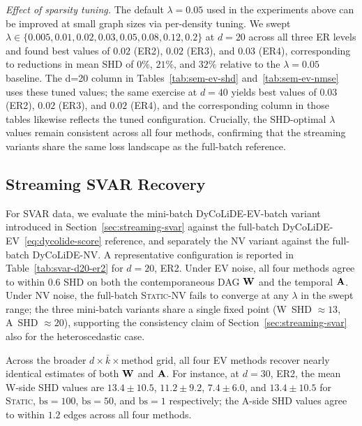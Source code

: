 \documentclass[journal,twoside]{IEEEtran}
\begin{document}
\textit{Effect of sparsity tuning.} The default $\lambda = 0.05$ used
in the experiments above can be improved at small graph sizes via
per-density tuning. We swept
$\lambda \in \{0.005, 0.01, 0.02, 0.03, 0.05, 0.08, 0.12, 0.2\}$ at
$d = 20$ across all three ER levels and found best values of
$0.02$ (ER2), $0.02$ (ER3), and $0.03$ (ER4), corresponding to
reductions in mean SHD of $0\%$, $21\%$, and $32\%$ relative to the
$\lambda = 0.05$ baseline. The d=20 column in
Tables~\ref{tab:sem-ev-shd} and~\ref{tab:sem-ev-nmse} uses these tuned
values; the same exercise at $d = 40$ yields best values of $0.03$
(ER2), $0.02$ (ER3), and $0.02$ (ER4), and the corresponding column
in those tables likewise reflects the tuned configuration.
Crucially, the SHD-optimal $\lambda$ values remain consistent across
all four methods, confirming that the streaming variants share the
same loss landscape as the full-batch reference.



\subsection{Streaming SVAR Recovery}
\label{sec:exp-svar}
For SVAR data, we evaluate the mini-batch
DyCoLiDE-EV-batch variant introduced in
Section~\ref{sec:streaming-svar} against the full-batch
DyCoLiDE-EV~\eqref{eq:dycolide-score} reference, and separately the
NV variant against the full-batch DyCoLiDE-NV. A representative
configuration is reported in Table~\ref{tab:svar-d20-er2} for
$d = 20$, ER2. Under EV noise, all four methods agree to within
$0.6$ SHD on both the contemporaneous DAG ${\mathbf W}$ and the temporal
${\mathbf A}$. Under NV noise, the full-batch \textsc{Static}-NV fails to
converge at any $\lambda$ in the swept range; the three mini-batch
variants share a single fixed point (W~SHD $\approx 13$, A~SHD
$\approx 20$), supporting the consistency claim of
Section~\ref{sec:streaming-svar} also for the heteroscedastic case.

Across the broader $d \times \bar{k} \times \text{method}$ grid, all
four EV methods recover nearly identical estimates of both ${\mathbf W}$ and
${\mathbf A}$. For instance, at $d = 30$, ER2, the mean
W-side SHD values are $13.4 \pm 10.5$, $11.2 \pm 9.2$,
$7.4 \pm 6.0$, and $13.4 \pm 10.5$ for \textsc{Static},
$\mathrm{bs} = 100$, $\mathrm{bs} = 50$, and $\mathrm{bs} = 1$
respectively; the A-side SHD values agree to within $1.2$ edges across
all four methods.
\end{document}
